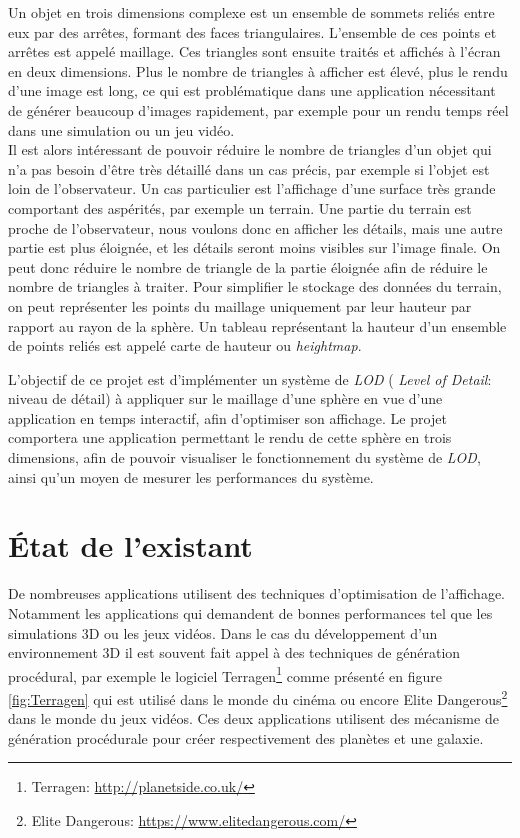 \documentclass[12pt]{report}
\begin{document}
Un objet en trois dimensions complexe est un ensemble de sommets reliés
entre eux par des arrêtes, formant des faces triangulaires. L'ensemble
de ces points et arrêtes est appelé maillage. Ces triangles sont ensuite
traités et affichés à l'écran en deux dimensions. Plus le nombre de
triangles à afficher est élevé, plus le rendu d'une image est long, ce
qui est problématique dans une application nécessitant de générer
beaucoup d'images rapidement, par exemple pour un rendu temps réel dans
une simulation ou un jeu vidéo.\\
Il est alors intéressant de pouvoir réduire le nombre de triangles d'un
objet qui n'a pas besoin d'être très détaillé dans un cas précis, par
exemple si l'objet est loin de l'observateur. Un cas particulier est
l'affichage d'une surface très grande comportant des aspérités, par
exemple un terrain. Une partie du terrain est proche de l'observateur,
nous voulons donc en afficher les détails, mais une autre partie est
plus éloignée, et les détails seront moins visibles sur l'image finale.
On peut donc réduire le nombre de triangle de la partie éloignée afin de
réduire le nombre de triangles à traiter. Pour simplifier le stockage
des données du terrain, on peut représenter les points du maillage
uniquement par leur hauteur par rapport au rayon de la sphère. Un
tableau représentant la hauteur d'un ensemble de points reliés est
appelé carte de hauteur ou \emph{heightmap}.

L'objectif de ce projet est d'implémenter un système de \emph{LOD} (
\emph{Level of Detail}: niveau de détail) à appliquer sur le maillage
d'une sphère en vue d'une application en temps interactif, afin
d'optimiser son affichage. Le projet comportera une application
permettant le rendu de cette sphère en trois dimensions, afin de pouvoir
visualiser le fonctionnement du système de \emph{LOD}, ainsi qu'un moyen
de mesurer les performances du système.

\newpage

\chapter*{État de l'existant}
\setcounter{chapter}{2}

De nombreuses applications utilisent des techniques d'optimisation de
l'affichage. Notamment les applications qui demandent de bonnes
performances tel que les simulations 3D ou les jeux vidéos.
Dans le cas du développement d'un environnement 3D il est souvent fait
appel à des techniques de génération procédural, par exemple le logiciel
Terragen\footnote{Terragen: \url{http://planetside.co.uk/}} comme
présenté en figure \ref{fig:Terragen} qui est utilisé dans le monde du
cinéma ou encore Elite Dangerous\footnote{Elite Dangerous:
\url{https://www.elitedangerous.com/}} dans le monde du jeux vidéos.
Ces deux applications utilisent des mécanisme de génération procédurale
pour créer respectivement des planètes et une galaxie.
\end{document}
